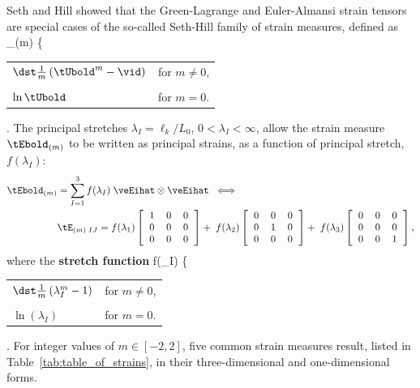 Seth and Hill showed that the 
Green-Lagrange and Euler-Almansi 
strain tensors are special cases of the so-called
Seth-Hill family of strain measures, defined as
\be
 \tEbold_{(m)}  
 \left\{ 
	 \begin{tabular}{ll}
	   $\dst\frac{1}{m}\left(\tUbold^m - \vid \right)$ & for $m\neq0$, \\
	   & \\
	   $\ln\tUbold$ & for $m=0$.
	 \end{tabular}
 \right.
 \label{eq:seth_hill}
\ee
The principal stretches $\lambda_I = \ell_k / L_0$, $0 < \lambda_I < \infty$,
allow the strain measure $\tEbold_{(m)}$ to be written as principal
strains, as a function of principal stretch, $f(\lambda_I)$:
\begin{align}
  \tEbold_{(m)} 
  &= \sum_{I=1}^3 f(\lambda_I) \; \veEihat \otimes \veEihat
  \;\;\Longleftrightarrow \;\; 
  \nonumber \\
  & 
  \tE_{(m)\;IJ} = f(\lambda_1)
  \left[ 
  \begin{tabular}{ccc}
  1 & 0 & 0 \\ 
  0 & 0 & 0 \\
  0 & 0 & 0 
  \end{tabular}
  \right] 
  + \; 
  f(\lambda_2)
  \left[ 
  \begin{tabular}{ccc}
  0 & 0 & 0 \\ 
  0 & 1 & 0 \\
  0 & 0 & 0 
  \end{tabular}
  \right] 
  + \; 
  f(\lambda_3)
  \left[ 
  \begin{tabular}{ccc}
  0 & 0 & 0 \\ 
  0 & 0 & 0 \\
  0 & 0 & 1 
  \end{tabular}
  \right],
\end{align}
where the {\bf stretch function}
\be
 f(\lambda_I) 
 \left\{ 
	 \begin{tabular}{ll}
	   $\dst\frac{1}{m}\left(\lambda_I^m - 1 \right)$ & for $m\neq0$, \\
	   & \\
	   $\ln(\lambda_I)$ & for $m=0$.
	 \end{tabular}
 \right.
\ee
For integer values of $m \in [-2, 2]$, 
five common strain measures result, listed
in Table~\ref{tab:table_of_strains}, in their three-dimensional and
one-dimensional forms.
